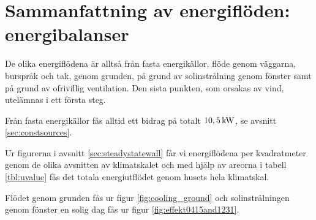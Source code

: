 \section{Sammanfattning av energiflöden: energibalanser}

De olika energiflödena är alltså från fasta energikällor, flöde genom väggarna, burspråk och tak, genom grunden, på grund av solinstrålning genom fönster samt på grund av ofrivillig ventilation. Den sista punkten, som orsakas av vind, utelämnas i ett första steg.

Från fasta energikällor fås alltid ett bidrag på totalt $\unit[10,5]{kW}$, se avsnitt \ref{sec:constsources}.

Ur figurerna i avsnitt \ref{sec:steadystatewall} får vi energiflödena per kvadratmeter genom de olika avsnitten av klimatskalet och med hjälp av areorna i tabell \ref{tbl:uvalue} fås det totala energiutflödet genom husets hela klimatskal.

Flödet genom grunden fås ur figur \ref{fig:cooling_ground} och solinstrålningen genom fönster en solig dag fås ur figur \ref{fig:effekt0415and1231}.


